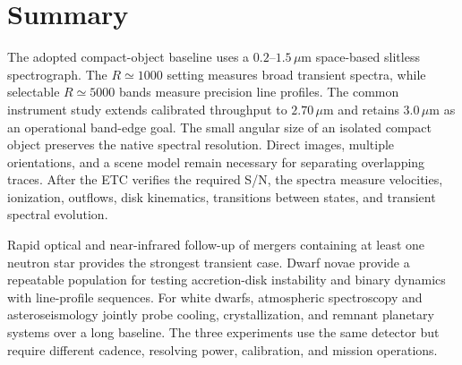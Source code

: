 \documentclass[10pt,onecolumn]{article}
\newcommand{\micron}{\,\mu\mathrm{m}}
\begin{document}
\section{Summary}

The adopted compact-object baseline uses a $0.2$--$1.5\micron$ space-based
slitless spectrograph. The $R\simeq1000$ setting measures broad transient
spectra, while selectable $R\simeq5000$ bands measure precision line profiles.
The common instrument study extends calibrated throughput to $2.70\micron$
and retains $3.0\micron$ as an operational band-edge goal. The small angular
size of an isolated compact object preserves the native spectral resolution.
Direct images, multiple orientations, and a scene model remain necessary for
separating overlapping traces. After the ETC verifies the required S/N, the
spectra measure velocities, ionization, outflows, disk kinematics, transitions
between states, and transient spectral evolution.

Rapid optical and near-infrared follow-up of mergers containing at least one
neutron star provides the strongest transient case. Dwarf novae provide a
repeatable population for testing accretion-disk instability and binary
dynamics with line-profile sequences. For white dwarfs, atmospheric
spectroscopy and asteroseismology jointly probe cooling, crystallization, and
remnant planetary systems over a long baseline. The three experiments use the
same detector but require different cadence, resolving power, calibration, and
mission operations.
\end{document}
